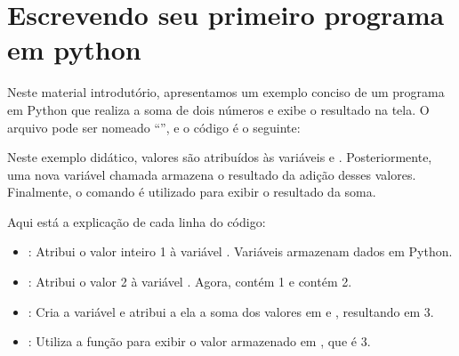 \documentclass[letterpaper,10pt,english]{jupyterBook}
\begin{document}
\section{Escrevendo seu primeiro programa em python}
\label{\detokenize{chapters/ch1/ch1:escrevendo-seu-primeiro-programa-em-python}}
\sphinxAtStartPar
Neste material introdutório, apresentamos um exemplo conciso de um programa em Python que realiza a soma de dois números e exibe o resultado na tela. O arquivo pode ser nomeado “”, e o código é o seguinte:

\begin{sphinxVerbatim}[commandchars=\\\{\}]
  
  
    
\end{sphinxVerbatim}

\begin{sphinxVerbatim}[commandchars=\\\{\}]
\end{sphinxVerbatim}

\sphinxAtStartPar
Neste exemplo didático, valores são atribuídos às variáveis  e . Posteriormente, uma nova variável chamada  armazena o resultado da adição desses valores. Finalmente, o comando  é utilizado para exibir o resultado da soma.

\sphinxAtStartPar
Aqui está a explicação de cada linha do código:
\begin{itemize}
\item {} 
\sphinxAtStartPar
{}: Atribui o valor inteiro 1 à variável . Variáveis armazenam dados em Python.

\item {} 
\sphinxAtStartPar
{}: Atribui o valor 2 à variável . Agora,  contém 1 e  contém 2.

\item {} 
\sphinxAtStartPar
{}: Cria a variável  e atribui a ela a soma dos valores em  e , resultando em 3.

\item {} 
\sphinxAtStartPar
{}: Utiliza a função  para exibir o valor armazenado em , que é 3.

\end{itemize}
\end{document}
